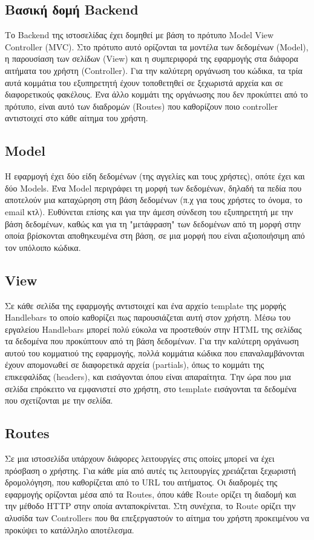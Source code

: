 \documentclass[manuscript,screen,review, language=greek, language=english]{acmart}
\begin{document}
\subsection{Βασική δομή Backend}
	Το Backend της ιστοσελίδας έχει δομηθεί με βάση το πρότυπο Model View Controller
	(MVC). Στο πρότυπο αυτό ορίζονται τα μοντέλα των δεδομένων (Model), η παρουσίαση των
	σελίδων (View) και η συμπεριφορά της εφαρμογής στα διάφορα αιτήματα του χρήστη
	(Controller). Για την καλύτερη οργάνωση του κώδικα, τα τρία αυτά κομμάτια του
	εξυπηρετητή έχουν τοποθετηθεί σε ξεχωριστά αρχεία και σε διαφορετικούς φακέλους.
	Ένα άλλο κομμάτι της οργάνωσης που δεν προκύπτει από το πρότυπο, είναι αυτό των
	διαδρομών (Routes) που καθορίζουν ποιο controller αντιστοιχεί στο κάθε αίτημα
	του χρήστη.

\subsection{Model}
	Η εφαρμογή έχει δύο είδη δεδομένων (της αγγελίες και τους χρήστες), οπότε έχει και
	δύο Models. Ένα Model περιγράφει τη μορφή των δεδομένων, δηλαδή τα πεδία που
	αποτελούν μια καταχώρηση στη βάση δεδομένων (π.χ για τους χρήστες το όνομα, το email
	κτλ). Ευθύνεται επίσης και για την άμεση σύνδεση του εξυπηρετητή με την βάση
	δεδομένων, καθώς και για τη "μετάφραση" των δεδομένων από τη μορφή στην οποία
	βρίσκονται αποθηκευμένα στη βάση, σε μια μορφή που είναι αξιοποιήσιμη από τον
	υπόλοιπο κώδικα.

\subsection{View}
	Σε κάθε σελίδα της εφαρμογής αντιστοιχεί και ένα αρχείο template της μορφής
	Handlebars το οποίο καθορίζει πως παρουσιάζεται αυτή στον χρήστη.
	Μέσω του εργαλείου Handlebars μπορεί πολύ εύκολα
	να προστεθούν στην HTML της σελίδας τα δεδομένα που προκύπτουν από τη βάση δεδομένων.
	Για την καλύτερη οργάνωση αυτού του κομματιού της εφαρμογής, πολλά κομμάτια κώδικα
	που επαναλαμβάνονται έχουν απομονωθεί σε διαφορετικά αρχεία (partials), όπως το
	κομμάτι της επικεφαλίδας (headers), και εισάγονται όπου είναι απαραίτητα. Την ώρα που
	μια σελίδα επρόκειτο να εμφανιστεί στο χρήστη, στο template εισάγονται τα δεδομένα
	που σχετίζονται με την σελίδα.

\subsection{Routes}
	Σε μια ιστοσελίδα υπάρχουν διάφορες λειτουργίες στις οποίες μπορεί να έχει πρόσβαση
	ο χρήστης. Για κάθε μία από αυτές τις λειτουργίες χρειάζεται ξεχωριστή δρομολόγηση,
	που καθορίζεται από το URL του αιτήματος. Οι διαδρομές της εφαρμογής ορίζονται μέσα
	από τα Routes, όπου κάθε Route ορίζει τη διαδομή και την μέθοδο HTTP στην οποία
	ανταποκρίνεται. Στη συνέχεια, το Route ορίζει την αλυσίδα των Controllers που θα
	επεξεργαστούν το αίτημα του χρήστη προκειμένου να προκύψει το κατάλληλο αποτέλεσμα.
\end{document}
